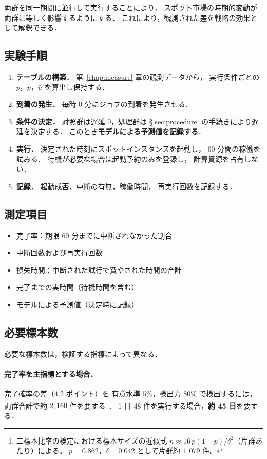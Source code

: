 \documentclass[11pt,a4paper]{ltjsreport}
\begin{document}
両群を同一期間に並行して実行することにより，
スポット市場の時期的変動が両群に等しく影響するようにする．
これにより，観測された差を戦略の効果として解釈できる．

\subsection{実験手順}

\begin{enumerate}
  \item \textbf{テーブルの構築．}
        第~\ref{chap:measure} 章の観測データから，
        実行条件ごとの $p$，$\tilde p$，$\bar u$ を算出し保持する．
  \item \textbf{到着の発生．}
        毎時 0 分にジョブの到着を発生させる．
  \item \textbf{条件の決定．}
        対照群は遅延 $0$，処理群は
        \S\ref{sec:procedure} の手続きにより遅延を決定する．
        このとき\textbf{モデルによる予測値を記録する}．
  \item \textbf{実行．}
        決定された時刻にスポットインスタンスを起動し，
        $60$ 分間の稼働を試みる．
        待機が必要な場合は起動予約のみを登録し，
        計算資源を占有しない．
  \item \textbf{記録．}
        起動成否，中断の有無，稼働時間，
        再実行回数を記録する．
\end{enumerate}

\subsection{測定項目}

\begin{itemize}
  \item 完了率：期限 $60$ 分までに中断されなかった割合
  \item 中断回数および再実行回数
  \item 損失時間：中断された試行で費やされた時間の合計
  \item 完了までの実時間（待機時間を含む）
  \item モデルによる予測値（決定時に記録）
\end{itemize}

\subsection{必要標本数}

必要な標本数は，検証する指標によって異なる．

\paragraph{完了率を主指標とする場合．}
完了確率の差（$4.2$ ポイント）を
有意水準 $5\%$，検出力 $80\%$ で検出するには，
両群合計で約 $2{,}160$ 件を要する\footnote{%
二標本比率の検定における標本サイズの近似式
$n \approx 16\,\bar p(1-\bar p)/\delta^{2}$（片群あたり）による。
$\bar p = 0.862$，$\delta = 0.042$ として片群約 $1{,}079$ 件。}．
1 日 48 件を実行する場合，\textbf{約 45 日}を要する．
\end{document}
